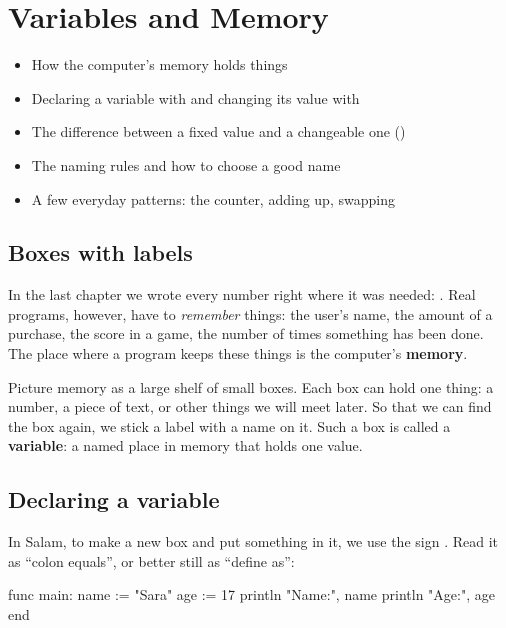 \chapter{Variables and Memory}\label{ch:variables}

\begin{goals}
\begin{itemize}
  \item How the computer's memory holds things
  \item Declaring a variable with \code{:=} and changing its value with \code{=}
  \item The difference between a fixed value and a changeable one ()
  \item The naming rules and how to choose a good name
  \item A few everyday patterns: the counter, adding up, swapping
\end{itemize}
\end{goals}

\section{Boxes with labels}

In the last chapter we wrote every number right where it was needed:
. Real programs, however, have to \emph{remember}
things: the user's name, the amount of a purchase, the score in a game, the
number of times something has been done. The place where a program keeps
these things is the computer's \textbf{memory}.

Picture memory as a large shelf of small boxes. Each box can hold one thing:
a number, a piece of text, or other things we will meet later. So that we can
find the box again, we stick a label with a name on it. Such a box is called
a \textbf{variable}: a named place in memory that holds one value.

\section{Declaring a variable}

In Salam, to make a new box and put something in it, we use the sign
\code{:=}. Read it as ``colon equals'', or better still as ``define as'':

\begin{salamcode}
func main:
    name := "Sara"
    age := 17
    println "Name:", name
    println "Age:", age
end
\end{salamcode}


